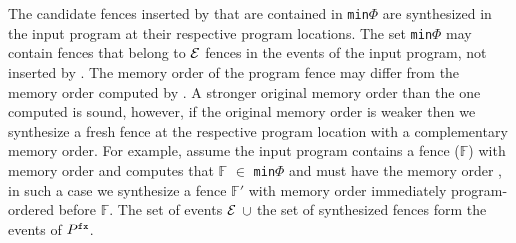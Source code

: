 The candidate fences inserted by \ourtechnique that 
are contained in {\tt min$\Phi$} are synthesized in
the input program at their respective program 
locations. 
%
The set {\tt min$\Phi$} may contain fences that belong
to $\mathcal{E}$ \ie fences in the events of the input 
program, not inserted by \ourtechnique. The memory
order of the program fence may differ from the memory
order computed by \ourtechnique.
%
A stronger original memory order than the one computed
is sound, however, if the original memory order is
weaker then we synthesize a fresh fence at the 
respective program location with a complementary
memory order. 
%
For example, assume the input program contains a fence 
($\mathbb{F}$) with memory order \rel and 
\ourtechnique computes that $\mathbb{F}$
$\in$ {\tt min$\Phi$} and must have the memory order
\acqrel, in such a case we synthesize a fence 
$\mathbb{F}'$ with memory order \acq immediately 
program-ordered before $\mathbb{F}$.
%
The set of events $\mathcal{E}$ $\cup$ the set of 
synthesized fences form the events of ${P}^{\mathtt{fx}}$.